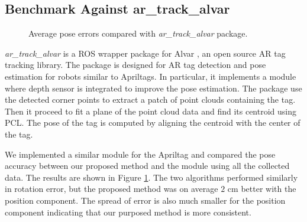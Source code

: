 \subsection{Benchmark Against ar\_track\_alvar}

\begin{figure}
\centering
{}
\caption{Average pose errors compared with \textit{ar\_track\_alvar} package.}
\label{fig:alvartrack}
\end{figure}

\textit{ar\_track\_alvar} is a ROS wrapper package for Alvar \citep{alvartrack}, an open source AR tag tracking library. The package is designed for AR tag detection and pose estimation for robots similar to Apriltags. In particular, it implements a module where depth sensor is integrated to improve the pose estimation. The package use the detected corner points to extract a patch of point clouds containing the tag. Then it proceed to fit a plane of the point cloud data and find its centroid using PCL. The pose of the tag is computed by aligning the centroid with the center of the tag.   

We implemented a similar module for the Apriltag and compared the pose accuracy between our proposed method and the module using all the collected data. The results are shown in Figure \ref{fig:alvartrack}. The two algorithms performed similarly in rotation error, but the proposed method was on average $2$ cm better with the position component. The spread of error is also much smaller for the position component indicating that our purposed method is more consistent.

